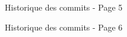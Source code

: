 \documentclass [a4 paper,11pt]{report}
\begin{document}
\begin{center}
  \begin{figure}[h!]
  \noindent{}
  \caption{Historique des commits - Page 5}
  \end{figure}

  \begin{figure}[h!]
  \noindent{}
  \caption{Historique des commits - Page 6}
  \end{figure}

\end{center}
\newpage


\chapter*{}
\thispagestyle{empty}
\end{document}
